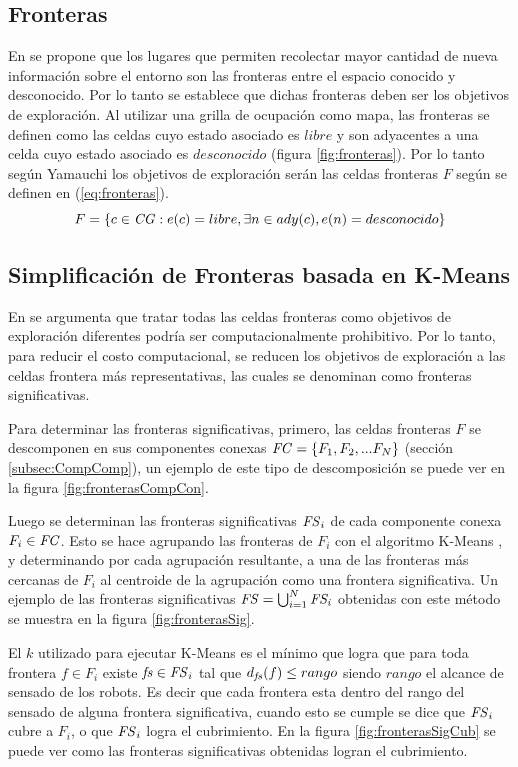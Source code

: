 \subsection{Fronteras}
En \cite{yamauchi1998frontier} se propone que los lugares que permiten
recolectar mayor cantidad de nueva información sobre el entorno son las
fronteras entre el espacio conocido y desconocido. Por lo tanto se establece que dichas
fronteras deben ser los objetivos de exploración.
Al utilizar una grilla de ocupación como mapa, las fronteras se definen como las
celdas cuyo estado asociado es $libre$ y son adyacentes a una celda cuyo estado
asociado es $desconocido$ (figura \ref{fig:fronteras}).
Por lo tanto según Yamauchi los objetivos de exploración serán las celdas
fronteras $F$ según se definen en (\ref{eq:fronteras}).
\begin{equation} 
  F = \{ c \in \mathit{CG} : e(c) = libre, \exists n \in ady(c), e(n) = desconocido  \}
  \label{eq:fronteras}
\end{equation}

\subsection{Simplificación de Fronteras basada en K-Means}
En \cite{Amorin2019} se argumenta que tratar todas las celdas fronteras como
objetivos de exploración diferentes podría ser computacionalmente prohibitivo.
Por lo tanto, para reducir el costo computacional, se reducen los objetivos de
exploración a las celdas frontera más representativas, las cuales se
denominan como fronteras significativas.

Para determinar las fronteras significativas, primero, las celdas fronteras $F$
se descomponen en sus componentes conexas $\mathit{FC}=\{F_1,F_2,...F_N\}$
(sección \ref{subsec:CompComp}), un ejemplo de este tipo de descomposición se
puede ver en la figura \ref{fig:fronterasCompCon}.

Luego se determinan las fronteras significativas $\mathit{FS}_i$ de cada
componente conexa $F_i\in \mathit{FC}$. Esto se hace agrupando las fronteras de
$F_i$ con el algoritmo K-Means \cite{macqueen1967some}, y determinando por cada
agrupación resultante, a una de las fronteras más cercanas de $F_i$ al
centroide de la agrupación como una frontera significativa. Un ejemplo de
las fronteras significativas $\mathit{FS} = \bigcup_{i=1}^N \mathit{FS_i}$ obtenidas
con este método se muestra en la figura \ref{fig:fronterasSig}.

El $k$ utilizado para ejecutar K-Means es el mínimo que logra que para toda
frontera $f\in F_i$ existe $\mathit{fs} \in \mathit{FS}_i$ tal que $d_{\mathit{fs}}(f) \leq
rango$ siendo $rango$ el alcance de sensado de los robots. Es decir que %
cada frontera esta dentro del rango del sensado de alguna frontera
significativa, cuando esto se cumple se dice que $\mathit{FS}_i$ cubre a $F_i$, o
que $\mathit{FS}_i$ logra el cubrimiento. En la figura \ref{fig:fronterasSigCub} se
puede ver como las fronteras significativas obtenidas logran el cubrimiento.

